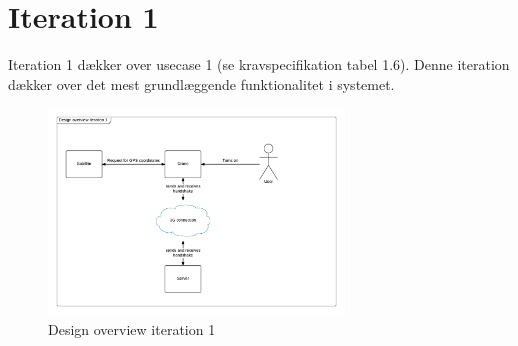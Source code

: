 \section{Iteration 1}

Iteration 1 dækker over usecase 1 (se kravspecifikation tabel 1.6). Denne iteration dækker over det mest grundlæggende funktionalitet i systemet. 


\vspace{-5pt}
\begin{figure}[H]
	\centering
	\includegraphics[width=0.7\textwidth]{kapitler/software/iterationer/iteration_1/billeder/design_overview_iteration1.png}
	\vspace{-5pt}
	\caption{Design overview iteration 1}
	\label{fig:design_overview_it1}
\end{figure}

